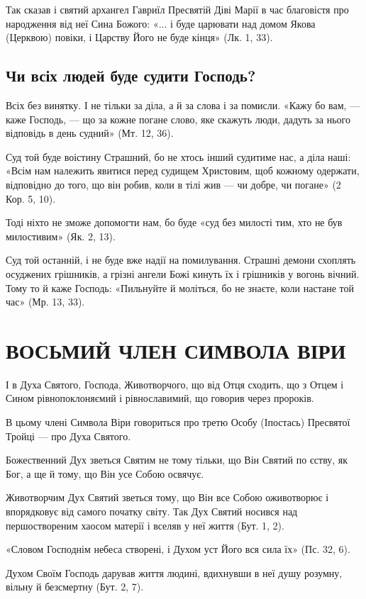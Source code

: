 \documentclass[main.tex]{subfiles}
\begin{document}
Так сказав і святий архангел Гавриїл Пресвятій Діві Марії в час благовістя про народження від неї Сина Божого: «... і буде царювати над домом Якова (Церквою) повіки, і Царству Його не буде кінця» (Лк. 1, 33).
 
\subsection{Чи всіх людей буде судити Господь?}

Всіх без винятку. І не тільки за діла, а й за слова і за помисли. «Кажу бо вам, — каже Господь, — що за кожне погане слово, яке скажуть люди, дадуть за нього відповідь в день судний» (Мт. 12, 36).

Суд той буде воістину Страшний, бо не хтось інший судитиме нас, а діла наші: «Всім нам належить явитися перед судищем Христовим, щоб кожному одержати, відповідно до того, що він робив, коли в тілі жив — чи добре, чи погане» (2 Кор. 5, 10).

Тоді ніхто не зможе допомогти нам, бо буде «суд без милості тим, хто не був милостивим» (Як. 2, 13).

Суд той останній, і не буде вже надії на помилування. Страшні демони схоплять осуджених грішників, а грізні ангели Божі кинуть їх і грішників у вогонь вічний. Тому то й каже Господь: «Пильнуйте й моліться, бо не знаєте, коли настане той час» (Мр. 13, 33).

\section{ВОСЬМИЙ ЧЛЕН СИМВОЛА ВІРИ}
І в Духа Святого, Господа, Животворчого, що від Отця сходить, що з Отцем і Сином рівнопоклоняємий і рівнославимий, що говорив через пророків.

В цьому члені Символа Віри говориться про третю Особу (Іпостась) Пресвятої Тройці — про Духа Святого.

Божественний Дух зветься Святим не тому тільки, що Він Святий по єству, як Бог, а ще й тому, що Він усе Собою освячує.

Животворчим Дух Святий зветься тому, що Він все Собою оживотворює і впорядковує від самого початку світу. Так Дух Святий носився над першоствореним хаосом матерії і вселяв у неї життя (Бут. 1, 2).

«Словом Господнім небеса створені, і Духом уст Його вся сила їх» (Пс. 32, 6).

Духом Своїм Господь дарував життя людині, вдихнувши в неї душу розумну, вільну й безсмертну (Бут. 2, 7).
\end{document}
